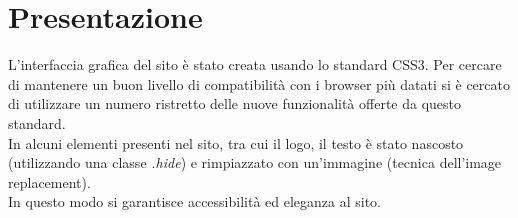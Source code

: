 \section{Presentazione}
L'interfaccia grafica del sito è stato creata usando lo standard CSS3.
Per cercare di mantenere un buon livello di compatibilità con i browser più
datati si è cercato di utilizzare un numero ristretto delle nuove funzionalità offerte da
questo standard.\\
In alcuni elementi presenti nel sito, tra cui il logo, il testo è stato nascosto (utilizzando una classe \textit{.hide}) e rimpiazzato con un'immagine (tecnica dell'image replacement).\\
In questo modo si garantisce accessibilità ed eleganza al sito.


\newpage